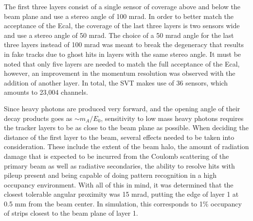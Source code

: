 The first three layers consist of a single sensor of coverage above and below
the beam plane and use a stereo angle of 100 mrad. In order to better match the
acceptance of the Ecal, the coverage of the last three layers is two sensors 
wide and use a stereo angle of 50 mrad.  The choice of a 50 mrad angle for the
last three layers instead of 100 mrad was meant to break the degeneracy that
results in fake tracks
due to ghost hits in layers with the same stereo angle.  It must be noted that
only five layers are needed to match the full acceptance of the Ecal, however,
an improvement in the momentum resolution was observed with the addition of 
another layer.  In total, the SVT makes use of 36 sensors, which amounts to 
23,004 channels.

Since heavy photons are produced very forward, and the opening angle of their 
decay products goes as $\sim m_{A}/E_{0}$, sensitivity to low mass heavy photons
requires
the tracker layers to be as close to the beam plane as possible.  When deciding
the distance of the first layer to the beam, several effects needed to be taken
into consideration. These include the extent of the beam halo, the amount of 
radiation damage that is expected to be incurred from the Coulomb scattering
of the primary beam as well as radiative secondaries, the ability to resolve 
hits with pileup present and being capable of doing pattern recognition in a high 
occupancy environment.  With all of this in mind, it was determined that the 
closest tolerable angular proximity was 15 mrad, putting the edge of layer 1 
at 0.5 mm from the beam center. In simulation, this corresponds to 1\% occupancy
of strips closest to the beam plane of layer 1.


